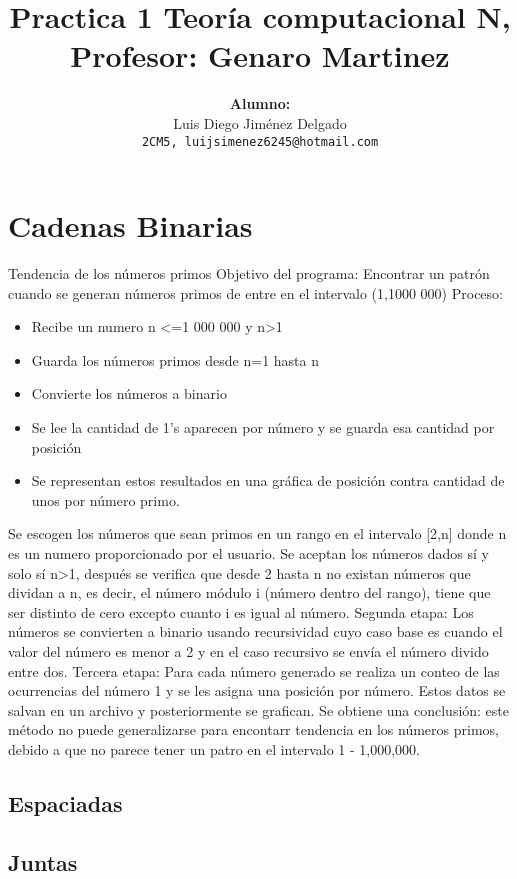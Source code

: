\documentclass[a4paper]{article}
\title{Practica 1 \newline \newline
	  \large \textbf{ Teoría computacional N, Profesor: Genaro Martinez} }
\author{\Large \textbf{Alumno:} \\ Luis Diego Jiménez Delgado \\ 
		\texttt{2CM5, luijsimenez6245@hotmail.com}}
\begin{document}
	\begin{titlepage}
		\maketitle
	\end{titlepage}
	{ \large \tableofcontents }
	\newpage
        \section{Cadenas Binarias}
        Tendencia de los números primos
Objetivo del programa: Encontrar un patrón cuando se generan números primos de entre en el intervalo (1,1000 000)
Proceso: 
\begin{itemize}
    \item Recibe un numero n <=1 000 000 y n>1
    \item Guarda los números primos desde n=1 hasta n
    \item Convierte los números a binario
    \item Se lee la cantidad de 1’s aparecen por número y se guarda esa cantidad por posición
    \item  Se representan estos resultados en una gráfica de posición contra cantidad de unos por número primo.
    \end{itemize}
Se escogen los números que sean primos en un rango en el intervalo [2,n] donde n es un numero proporcionado por el usuario. Se aceptan los números dados sí y solo sí n>1, después se verifica que desde 2 hasta n no existan números que dividan a n, es decir, el número módulo i (número dentro del rango), tiene que ser distinto de cero excepto cuanto i es igual al número.
Segunda etapa: Los números se convierten a binario usando recursividad cuyo caso base es cuando el valor del número es menor a 2 y en el caso recursivo se envía el número divido entre dos.
Tercera etapa: Para cada número generado se realiza un conteo de las ocurrencias del número 1 y se les asigna una posición por número. Estos datos se salvan en un archivo y posteriormente se grafican.
Se obtiene una conclusión: este método no puede generalizarse para encontarr tendencia en los números primos, debido a que no parece tener un patro en el intervalo 1 - 1,000,000.
            \subsection{Espaciadas}
            
			\subsection{Juntas}
\end{document}
